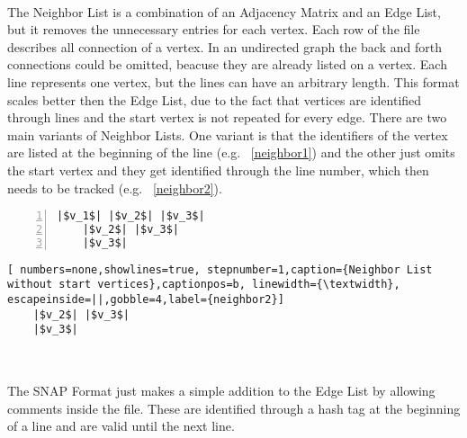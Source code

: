 \\
The Neighbor List is a combination of an Adjacency Matrix and an Edge List, but it removes the unnecessary entries for each vertex. Each row of the file describes all connection of a vertex. In an undirected graph the back and forth connections could be omitted, beacuse they are already listed on a vertex. Each line represents one vertex, but the lines can have an arbitrary length. This format scales better then the Edge List, due to the fact that vertices are identified through lines and the start vertex is not repeated for every edge. There are two main variants of Neighbor Lists. One variant is that the identifiers of the vertex are listed at the beginning of the line (e.g. ~\ref{neighbor1}) and the other just omits the start vertex and they get identified through the line number, which then needs to be tracked (e.g. ~\ref{neighbor2}).\\
\noindent\begin{minipage}{.48\textwidth}
	\begin{lstlisting}[numbers=left,firstnumber=1,numberfirstline=true,caption={Neighbor List with start vertices},captionpos=b, linewidth={\textwidth}, escapeinside=||,gobble=4,label={neighbor1}]
	|$v_1$| |$v_2$| |$v_3$|
	|$v_2$| |$v_3$|
	|$v_3$|
	\end{lstlisting}
\end{minipage}\hfill
\begin{minipage}{.48\textwidth}
	\begin{lstlisting}[ numbers=none,showlines=true, stepnumber=1,caption={Neighbor List without start vertices},captionpos=b, linewidth={\textwidth}, escapeinside=||,gobble=4,label={neighbor2}]
	|$v_2$| |$v_3$|
	|$v_3$|
	
	\end{lstlisting}
\end{minipage}

\\
The SNAP Format just makes a simple addition to the Edge List by allowing comments inside the file. These are identified through a hash tag at the beginning of a line and are valid until the next line.\\

